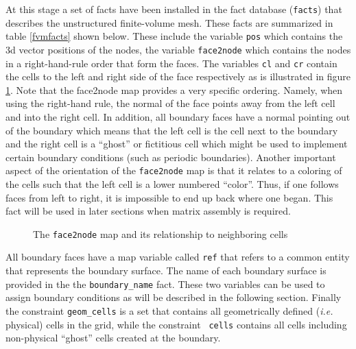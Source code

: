 \documentclass[10pt,epsf,letterpaper,twoside]{book}
\begin{document}
At this stage a set of facts have been installed in the fact database
({\tt facts}) that describes the unstructured finite-volume mesh.
These facts are summarized in table \ref{fvmfacts} shown below.  These
include the variable {\tt pos} which contains the 3d vector positions
of the nodes, the variable {\tt face2node} which contains the nodes in
a right-hand-rule order that form the faces.  The variables {\tt cl}
and {\tt cr} contain the cells to the left and right side of the face
respectively as is illustrated in figure \ref{face2node}.  Note that
the face2node map provides a very specific ordering.  Namely, when
using the right-hand rule, the normal of the face points away from the
left cell and into the right cell.  In addition, all boundary faces
have a normal pointing out of the boundary which means that the left
cell is the cell next to the boundary and the right cell is a
``ghost'' or fictitious cell which might be used to implement certain
boundary conditions (such as periodic boundaries).  Another important
aspect of the orientation of the {\tt face2node} map is that it
relates to a coloring of the cells such that the left cell is a lower
numbered ``color''.  Thus, if one follows faces from left to right, it
is impossible to end up back where one began.  This fact will be used
in later sections when matrix assembly is required.

\begin{figure}[htbp]
 \centerline{
  \epsfxsize=3in
  }
 \caption{The {\tt face2node} map and its relationship to neighboring cells}
 \label{face2node}
\end{figure}

All boundary faces have a map variable called {\tt ref} that refers to
a common entity that represents the boundary surface.  The name of
each boundary surface is provided in the the {\tt boundary\_name}
fact.  These two variables can be used to assign boundary conditions
as will be described in the following section.  Finally the constraint
{\tt geom\_cells} is a set that contains all geometrically defined
({\it i.e.} physical) cells in the grid, while the constraint {\tt
  cells} contains all cells including non-physical ``ghost'' cells
created at the boundary.
\end{document}
